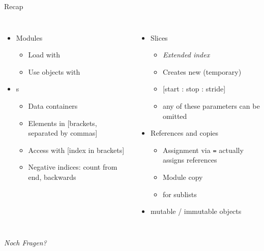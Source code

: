 
\begin{frame}[t,plain]
\titlepage
\end{frame}


\begin{frame}{Recap}
%
\begin{columns}[T]
\begin{itemize}
\item Modules
	\begin{itemize}
	\item Load with 
	\item Use objects with 
	\end{itemize}
\item {}s
	\begin{itemize}
	\item Data containers
	\item Elements in [brackets, separated by commas]
	\item Access with [index in brackets]
	\item Negative indices: count from end, backwards
	\end{itemize}
\end{itemize}
%
\begin{itemize}
\item Slices
	\begin{itemize}
	\item \emph{Extended index}
	\item Creates new (temporary) 
	\item \phantom{x} [start : stop : stride]
	\item any of these parameters can be omitted
	\end{itemize}
\item References and copies
	\begin{itemize}
	\item Assignment via \texttt{=} actually assigns references
	\item Module copy
	\item {} for sublists
	\end{itemize}
\item mutable / immutable objects
\end{itemize}

\end{columns}
%
\begin{center}
	\emph{Noch Fragen?}
\end{center}
%
\end{frame}


